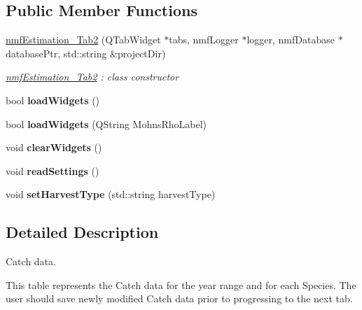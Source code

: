 \subsection*{Public Member Functions}
\begin{DoxyCompactItemize}
\item 
\hyperlink{classnmf_estimation___tab2_a81c4d112cfb52709ba46a2c287ea426e}{nmf\+Estimation\+\_\+\+Tab2} (Q\+Tab\+Widget $\ast$tabs, nmf\+Logger $\ast$logger, nmf\+Database $\ast$database\+Ptr, std\+::string \&project\+Dir)
\begin{DoxyCompactList}\small\item\em \hyperlink{classnmf_estimation___tab2}{nmf\+Estimation\+\_\+\+Tab2} \+: class constructor \end{DoxyCompactList}\item 
bool {\bfseries load\+Widgets} ()\hypertarget{classnmf_estimation___tab2_aa8b3ddbb2db6ff90cb2048bf4f87506e}{}\label{classnmf_estimation___tab2_aa8b3ddbb2db6ff90cb2048bf4f87506e}

\item 
bool {\bfseries load\+Widgets} (Q\+String Mohns\+Rho\+Label)\hypertarget{classnmf_estimation___tab2_a6d872df42e5a0bb847897fb36fa26766}{}\label{classnmf_estimation___tab2_a6d872df42e5a0bb847897fb36fa26766}

\item 
void {\bfseries clear\+Widgets} ()\hypertarget{classnmf_estimation___tab2_aa28f54f7a7c2cf18d31ca7df6e46d781}{}\label{classnmf_estimation___tab2_aa28f54f7a7c2cf18d31ca7df6e46d781}

\item 
void {\bfseries read\+Settings} ()\hypertarget{classnmf_estimation___tab2_a7dc05290661a758d33ba3b4f0cb4209d}{}\label{classnmf_estimation___tab2_a7dc05290661a758d33ba3b4f0cb4209d}

\item 
void {\bfseries set\+Harvest\+Type} (std\+::string harvest\+Type)\hypertarget{classnmf_estimation___tab2_a61801ee8195b5c9eb71750d71d8fb903}{}\label{classnmf_estimation___tab2_a61801ee8195b5c9eb71750d71d8fb903}

\end{DoxyCompactItemize}


\subsection{Detailed Description}
Catch data. 

This table represents the Catch data for the year range and for each Species. The user should save newly modified Catch data prior to progressing to the next tab. 

